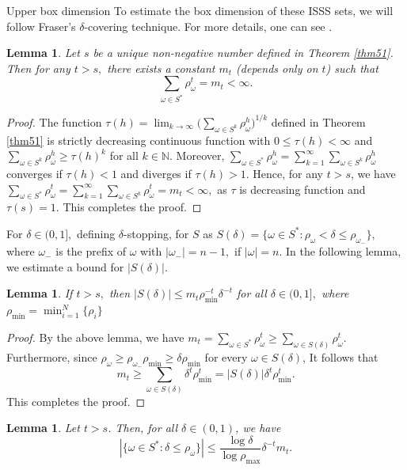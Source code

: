 \documentclass[12pt,oneside,reqno]{amsart}
\newtheorem{lemma}[theorem]{Lemma}
\theoremstyle{definition}
\theoremstyle{remark}
\begin{document}
\begin{subsection}{Upper box dimension}
To estimate the box dimension of these ISSS sets, we will follow Fraser's $\delta$-covering technique. For more details, one can see \cite{Fraser1}. 
\begin{lemma}\label{lema52}
    Let $s$ be a unique non-negative number defined in Theorem \ref{thm51}. Then for any $t > s,$ there exists a constant $m_t$ (depends only on $t$) such that 
    $$\sum_{\omega \in S^*}\rho_{\omega}^t = m_t < \infty.$$
\end{lemma}
\begin{proof}
   The function $\tau(h) = \lim_{k \to \infty} \bigg( \sum_{\omega \in S^k} \rho_{\omega}^h \bigg)^{1/k}$ defined in Theorem \ref{thm51} is strictly decreasing continuous function with $0 \le \tau(h) < \infty$ and $\sum_{\omega \in S^k} \rho_{\omega}^h \ge \tau(h)^k$ for all $k \in \mathbb{N}.$ Moreover, $\sum_{\omega \in S^*}\rho_{\omega}^h=\sum_{k=1}^{\infty} \sum_{\omega \in S^k}\rho_{\omega}^h$ converges if $\tau(h) < 1$ and diverges if $\tau(h) >1.$ Hence, for any $t > s$, we have $\sum_{\omega \in S^*}\rho_{\omega}^t=\sum_{k=1}^{\infty} \sum_{\omega \in S^k}\rho_{\omega}^t= m_t < \infty,$ as $\tau$ is decreasing function and $\tau(s)=1.$ This completes the proof. 
\end{proof}
For $\delta \in (0,1],$ defining $\delta$-stopping, for $S$ as 
$S(\delta) = \{ \omega \in S^* : \rho_{\omega} < \delta \le \rho_{\omega_{-}}\},$ where $\omega_{-}$ is the prefix of $\omega$ with $|\omega_{-}| = n-1,$ if $|\omega|= n.$
 In the following lemma, we estimate a bound for $|S(\delta)|.$
 \begin{lemma}\label{lemma53}
     If $t > s,$ then 
    $|S(\delta)| \le m_t \rho_{\min}^{-t} \delta^{-t}$ for all $\delta \in (0,1],$ where $\rho_{\min} = \min_{i=1}^N \{ \rho_i\}$
 \end{lemma}
 \begin{proof}
     By the above lemma, we have 
     $m_t =\sum_{\omega \in S^*}\rho_{\omega}^t \ge \sum_{\omega \in S(\delta)}\rho_{\omega}^t.$ Furthermore, since $\rho_\omega \ge \rho_{\omega_{-}} \rho_{\min} \ge \delta \rho_{\min}$ for every $\omega \in S(\delta)$, It follows that
     $$m_t \ge \sum_{\omega \in S(\delta)} \delta^t \rho_{\min}^t = |S(\delta)| \delta^t \rho_{\min}^t.$$
     This completes the proof.
 \end{proof}
 \begin{lemma}
Let $t>s$. Then, for all $\delta \in (0,1)$, we have
 $$|\{\omega \in S^* : \delta \le \rho_\omega\}| \le \frac{\log \delta}{\log \rho_{\max} }\delta^{-t} m_t. $$

\end{lemma}
\end{subsection}
\end{document}
